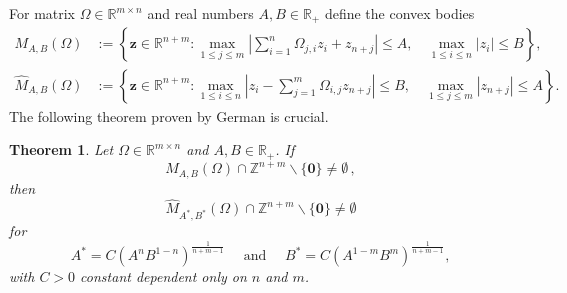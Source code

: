 \documentclass[10pt]{amsart}
\newtheorem{theorem}{Theorem}[section]
\theoremstyle{definition}
\newcommand{\R}{\mathbb{R}}
\newcommand{\Z}{\mathbb{Z}}
\begin{document}
For matrix $\Omega \in \R^{m\times n}$ and real numbers $A,B\in\R_{+}$ define the convex bodies
\begin{align*}
    M_{A,B}(\Omega)&:=\left\{ \boldsymbol{z}\in \R^{n+m}: \max_{1\leq j\leq m} \left| \sum_{i=1}^{n}\Omega_{j,i}z_{i}+z_{n+j}\right|\leq A, \quad \max_{1\leq i \leq n }|z_{i}|\leq B \right\}, \\
    \widehat{M}_{A,B}(\Omega)&:=\left\{ \boldsymbol{z}\in \R^{n+m}: \max_{1\leq i \leq n} \left|z_{i}-\sum_{j=1}^{m}\Omega_{i,j}z_{n+j}\right|\leq B, \quad \max_{1\leq j \leq m} |z_{n+j}|\leq A \right\}.
\end{align*}
The following theorem proven by German is crucial.
\begin{theorem}{\cite[Theorem 7]{german}} \label{transference}
Let $\Omega \in \R^{m\times n}$ and $A,B\in\R_{+}$. If
\begin{equation*}
    M_{A,B}(\Omega)\cap \Z^{n+m}\backslash\{ \boldsymbol{0} \} \neq \emptyset \, ,
\end{equation*}
then
\begin{equation*}
    \widehat{M}_{A^{*},B^{*}}(\Omega)\cap \Z^{n+m}\backslash \{ \boldsymbol{0} \} \neq \emptyset 
\end{equation*}
for 
\begin{equation*}
    A^{*}=C(A^{n}B^{1-n})^{\frac{1}{n+m-1}} \quad \text{ and } \quad B^{*}=C(A^{1-m}B^{m})^{\frac{1}{n+m-1}},
\end{equation*}
with $C>0$ constant dependent only on $n$ and $m$.
\end{theorem}
\end{document}
